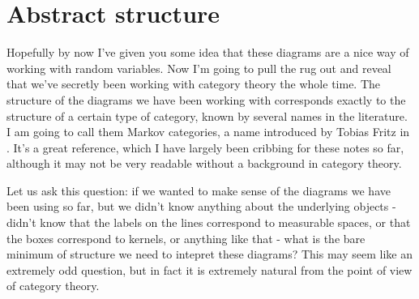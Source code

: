 \documentclass{article}
\begin{document}

\section{Abstract structure}
Hopefully by now I've given you some idea that these diagrams are a nice way of working with random variables.
Now I'm going to pull the rug out and reveal that we've secretly been working with category theory the whole time.
The structure of the diagrams we have been working with corresponds exactly to the structure of a certain type of category,
known by several names in the literature. I am going to call them Markov categories, a name introduced by Tobias Fritz in .
It's a great reference, which I have largely been cribbing for these notes so far, although it may not be very readable without a background in category theory.

Let us ask this question: if we wanted to make sense of the diagrams we have been using so far, but we didn't know anything about the underlying objects - didn't know that the labels on the lines correspond to measurable spaces, or that the boxes correspond to kernels, or anything like that - what is the bare minimum of structure we need to intepret these diagrams?
This may seem like an extremely odd question, but in fact it is extremely natural from the point of view of category theory.
\end{document}
